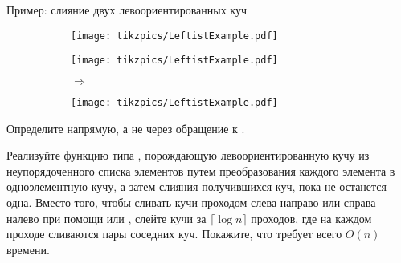 \begin{frame}{Пример: слияние двух левоориентированных куч}
\begin{figure}[ht]
\begin{subfigure}{.25\textwidth}
\texttt{[image: tikzpics/LeftistExample.pdf]}
\end{subfigure}
\begin{subfigure}{.25\textwidth}
\texttt{[image: tikzpics/LeftistExample.pdf]}
\end{subfigure}
\begin{subfigure}{.1\textwidth}
\Large $\Rightarrow$
\end{subfigure}
\begin{subfigure}{.3\textwidth}
\texttt{[image: tikzpics/LeftistExample.pdf]}
\end{subfigure}
\end{figure}
\end{frame}


\ifanswers
\begin{frame}[fragile]{}
\begin{exercise}\label{ex:3.2}
 Определите  напрямую, а не через обращение к .
\end{exercise}

\begin{exercise}\label{ex:3.3}
 Реализуйте функцию  типа ,
 порождающую левоориентированную кучу из неупорядоченного списка
 элементов путем преобразования каждого элемента в одноэлементную
 кучу, а затем слияния получившихся куч, пока не останется
 одна. Вместо того, чтобы сливать кучи проходом слева направо или
 справа налево при помощи  или ,
 слейте кучи за $\lceil \log n \rceil$ проходов, где на каждом
 проходе сливаются пары соседних куч. Покажите, что
  требует всего $O(n)$ времени.
\end{exercise}
\end{frame}

